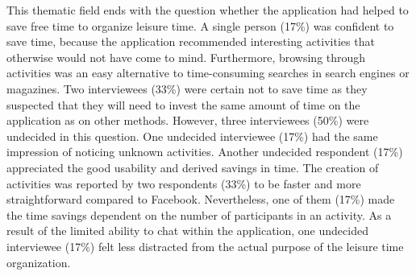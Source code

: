 \documentclass[12pt,numbers=noenddot,parskip,bibliography=totocnumbered,listof=totocnumbered,draft]{scrreprt}
\begin{document}
This thematic field ends with the question whether the application had helped to save free time to organize leisure time. A single person (17\%) was confident to save time, because the application recommended interesting activities that otherwise would not have come to mind. Furthermore, browsing through activities was an easy alternative to time-consuming searches in search engines or magazines. Two interviewees (33\%) were certain not to save time as they suspected that they will need to invest the same amount of time on the application as on other methods. However, three interviewees (50\%) were undecided in this question. One undecided interviewee (17\%) had the same impression of noticing unknown activities. Another undecided respondent (17\%) appreciated the good usability and derived savings in time. The creation of activities was reported by two respondents (33\%) to be faster and more straightforward compared to Facebook. Nevertheless, one of them (17\%) made the time savings dependent on the number of participants in an activity. As a result of the limited ability to chat within the application, one undecided interviewee (17\%) felt less distracted from the actual purpose of the leisure time organization.
\end{document}
